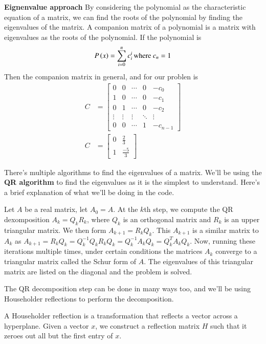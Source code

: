 \documentclass[journal]{IEEEtran}
\begin{document}
\textbf{Eignenvalue approach}
By considering the polynomial as the characteristic equation of a matrix, we can find the roots of the polynomial by finding the eigenvalues of the matrix. A companion matrix of a polynomial is a matrix with eigenvalues as the roots of the polynomial. If the polynomial is 
\begin{align}
  P\left(x\right)=\sum\limits_{i=0}^n c_i^{i}\,\text{where }c_n = 1
\end{align}
Then the companion matrix in general, and for our problen is 
\begin{align}
  C &= \begin{bmatrix}
    0&0&\cdots&0&-c_0\\
    1&0&\cdots&0&-c_1\\
    0&1&\cdots&0&-c_2\\
    \vdots&\vdots&\vdots&\ddots&\vdots\\
    0&0&\cdots&1&-c_{n-1}
  \end{bmatrix}\\
  C &= \begin{bmatrix}
    0&\frac{2}{3}\\
    1&\frac{-5}{3}
  \end{bmatrix}
\end{align}

There's multiple algorithms to find the eigenvalues of a matrix. We'll be using the \textbf{QR algorithm} to find the eigenvalues as it is the simplest to understand. Here's a brief explanation of what we'll be doing in the code. 

Let $A$ be a real matrix, let $A_0 = A$. At the $k$th step, we compute the QR dexomposition $A_k = Q_kR_k$, where $Q_k$ is an orthogonal matrix and $R_k$ is an upper triangular matrix. We then form $A_{k+1} = R_kQ_k$. This $A_{k+1}$ is a similar matrix to $A_k$  as $A_{k+1} = R_kQ_k = Q^{-1}_kQ_kR_kQ_k = Q^{-1}_kA_kQ_k = Q^T_kA_kQ_k$. Now, running these iterations multiple times, under certain conditions the matrices $A_k$ converge to a triangular matrix called the Schur form of $A$. The eigenvalues of this triangular matrix are listed on the diagonal and the problem is solved. 

The QR decomposition step can be done in many ways too, and we'll be using Householder reflections to perform the decomposition. 

A Householder reflection is a transformation that reflects a vector across a hyperplane. Given a vector $x$, we construct a reflection matrix $H$ such that it zeroes out all but the first entry of $x$. 
\end{document}
